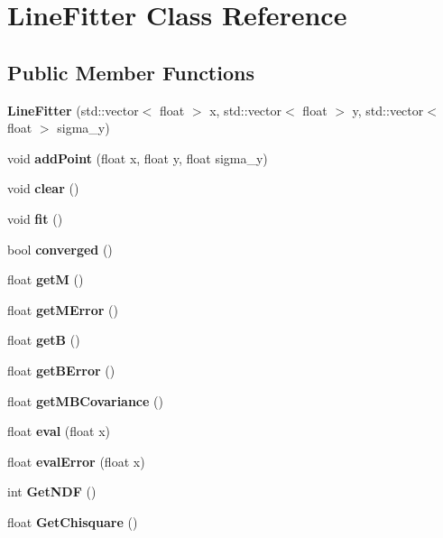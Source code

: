 \section{Line\-Fitter Class Reference}
\label{classLineFitter}
\subsection*{Public Member Functions}
\begin{DoxyCompactItemize}
\item 
{\bfseries Line\-Fitter} (std\-::vector$<$ float $>$ x, std\-::vector$<$ float $>$ y, std\-::vector$<$ float $>$ sigma\-\_\-y)\label{classLineFitter_afa54506230c2b69789d8405155b872e2}

\item 
void {\bfseries add\-Point} (float x, float y, float sigma\-\_\-y)\label{classLineFitter_a6c8d60770b882a3dfa7f497c6357e8c6}

\item 
void {\bfseries clear} ()\label{classLineFitter_abb9dcd9e88541d736c8e7d00e7760c98}

\item 
void {\bfseries fit} ()\label{classLineFitter_a0c8db2f9d3b0c0247abf09cb47b4194c}

\item 
bool {\bfseries converged} ()\label{classLineFitter_a2784cf556129b2bff9f4efb65dc577e4}

\item 
float {\bfseries get\-M} ()\label{classLineFitter_a06e09c67148d7e1dd5d6685ab0270988}

\item 
float {\bfseries get\-M\-Error} ()\label{classLineFitter_a21693b557fa869c24d7bdd4e67e9e2cf}

\item 
float {\bfseries get\-B} ()\label{classLineFitter_abda6c35013a6d0a0eed77320aff46e31}

\item 
float {\bfseries get\-B\-Error} ()\label{classLineFitter_aa2b281f268cd91c78beed523a36973a3}

\item 
float {\bfseries get\-M\-B\-Covariance} ()\label{classLineFitter_a5fe74da585902fbf1fb41698be2c05c2}

\item 
float {\bfseries eval} (float x)\label{classLineFitter_abf22cdfdd40160cfc60444a450bc069f}

\item 
float {\bfseries eval\-Error} (float x)\label{classLineFitter_a25e0bff99cfa6099550482b1af674d4d}

\item 
int {\bfseries Get\-N\-D\-F} ()\label{classLineFitter_a868ec66a5b8d1e0ff4255648e7d3d1dc}

\item 
float {\bfseries Get\-Chisquare} ()\label{classLineFitter_ad5366bef4af95ea825a9637b296844fa}

\end{DoxyCompactItemize}
